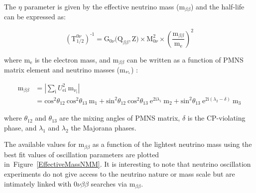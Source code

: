 \documentclass[main.tex]{subfiles}
\begin{document}
\NI The $\eta$ parameter is given by the effective neutrino mass (m$_{\beta\beta}$) and the half-life can be expressed as: 


\begin{equation}
(\text{T}_{\text{1/2}}^{\text{0}\nu})^{\text{-1}} = \text{G}_{\text{0}\nu}\text{(Q}_{\beta\beta},\text{Z)} \times \text{M}^\text{2}_{\text{0}\nu} \times \left( \frac{\text{m}_{\beta\beta}}{\text{m}_\text{e}} \right)^\text{2}
\end{equation}


\bigskip


\NI where m$_\text{e}$ is the electron mass, and m$_{\beta\beta}$ can be written as a function of PMNS matrix element and neutrino masses (m$_{\nu_\text{\i}}$) : 


\begin{equation}
\begin{split}
\text{m}_{\beta\beta} & = |\sum_\text{i}U_{\text{ei}}^\text{2}~\text{m}_{\nu_\text{i}} | \\
 & = \text{cos}^\text{2}\theta_{\text{12}}~\text{cos}^\text{2}\theta_{\text{13}}~\text{m}_\text{1} + \text{sin}^\text{2}\theta_{\text{12}}~\text{cos}^\text{2}\theta_{\text{13}}~\text{e}^{\text{2i}\lambda_\text{1}} ~\text{m}_\text{2} + \text{sin}^\text{2}\theta_{\text{13}}~\text{e}^{\text{2i}(\lambda_\text{2}-\delta)}~\text{m}_\text{3}
\end{split}
\end{equation}


\bigskip


\NI where $\theta_{\text{12}}$ and $\theta_{\text{13}}$ are the mixing angles of PMNS matrix, $\delta$ is the CP-violating phase, and $\lambda_\text{1}$ and $\lambda_\text{2}$ the Majorana phases.  


\bigskip


\NI The available values for m$_{\beta\beta}$ as a function of the lightest neutrino mass using the best fit values of oscillation parameters are plotted in~Figure~\ref{EffectiveMassNMM}. It is interesting to note that neutrino oscillation experiments do not give access to the neutrino nature or mass scale but are intimately linked with 0$\nu\beta\beta$ searches via m$_{\beta\beta}$. 
\end{document}
